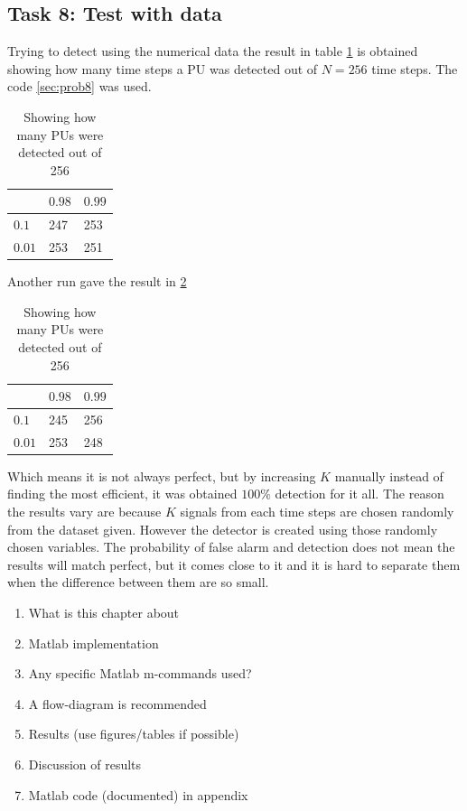 \subsection{Task 8: Test with data}
Trying to detect using the numerical data the result in table \ref{tab:detection} is obtained showing how many time steps a PU was detected out of $N=256$ time steps. The code \ref{sec:prob8} was used.
\begin{table}[ht]
\centering
\begin{tabular}{|l||l|l|}
\hline
\backslashbox{$\alpha$}{$\beta$} & $0.98$  & $0.99$  \\ \hline\hline
$0.1$  & 247 &  253 \\ \hline
$0.01$ & 253 & 251 \\ \hline
\end{tabular}
\caption{Showing how many PUs were detected out of 256}
\label{tab:detection}
\end{table}

Another run gave the result in \ref{tab:detection2}
\begin{table}[ht]
\centering
\begin{tabular}{|l||l|l|}
\hline
\backslashbox{$\alpha$}{$\beta$} & $0.98$  & $0.99$  \\ \hline\hline
$0.1$  & 245 & 256 \\ \hline
$0.01$ & 253 & 248 \\ \hline
\end{tabular}
\caption{Showing how many PUs were detected out of 256}
\label{tab:detection2}
\end{table}
Which means it is not always perfect, but by increasing $K$ manually instead of finding the most efficient, it was obtained $100\%$ detection for it all. The reason the results vary are because $K$ signals from each time steps are chosen randomly from the dataset given. However the detector is created using those randomly chosen variables. The probability of false alarm and detection does not mean the results will match perfect, but it comes close to it and it is hard to separate them when the difference between them are so small.

\begin{enumerate}[i]
    \item What is this chapter about
    \item Matlab implementation
    \item Any specific Matlab m-commands used?
    \item A flow-diagram is recommended
    \item Results (use figures/tables if possible)
    \item Discussion of results
    \item Matlab code (documented) in appendix
\end{enumerate}





